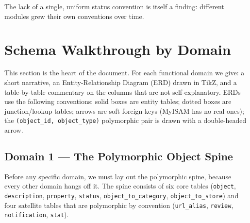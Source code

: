\documentclass[11pt,a4paper]{article}
\begin{document}
The lack of a single, uniform status convention is itself a finding:
different modules grew their own conventions over time.

\section{Schema Walkthrough by Domain}\label{sec:schema}

This section is the heart of the document. For each functional domain
we give: a short narrative, an Entity-Relationship Diagram (ERD) drawn
in TikZ, and a table-by-table commentary on the columns that are not
self-explanatory. ERDs use the following conventions: solid boxes are
entity tables; dotted boxes are junction/lookup tables; arrows are
soft foreign keys (MyISAM has no real ones); the
\texttt{(object\_id, object\_type)} polymorphic pair is drawn with a
double-headed arrow.

\subsection{Domain 1 --- The Polymorphic Object Spine}\label{sec:spine}

Before any specific domain, we must lay out the polymorphic spine,
because every other domain hangs off it. The spine consists of six
core tables (\texttt{object}, \texttt{description}, \texttt{property},
\texttt{status}, \texttt{object\_to\_category},
\texttt{object\_to\_store}) and four satellite tables that are
polymorphic by convention (\texttt{url\_alias}, \texttt{review},
\texttt{notification}, \texttt{stat}).
\end{document}
